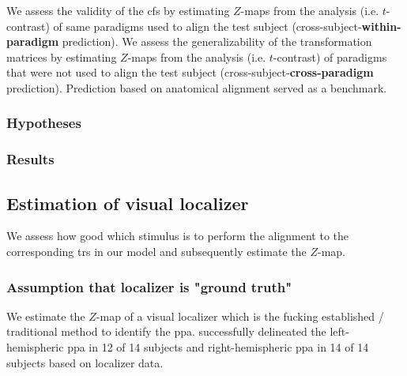 

%
We assess the validity of the \ac{cfs} by estimating $Z$-maps from the analysis
(i.e. $t$-contrast) of same paradigms used to align the test subject
(cross-subject-\textbf{within-paradigm} prediction).
%
We assess the generalizability of the transformation matrices by estimating
$Z$-maps from the analysis (i.e. $t$-contrast) of paradigms that were not used
to align the test subject (cross-subject-\textbf{cross-paradigm} prediction).
%
Prediction based on anatomical alignment served as a benchmark.


\subsubsection{Hypotheses}



\subsubsection{Results}







\subsection{Estimation of visual localizer}

We assess how good which stimulus is to perform the alignment to the
corresponding \acp{tr} in our model and subsequently estimate the $Z$-map.


\subsubsection{Assumption that localizer is "ground truth"}

We estimate the $Z$-map of a visual localizer which is the fucking established /
traditional method to identify the \ac{ppa}.
%
\citet{sengupta2016extension} successfully delineated the left-hemispheric
\ac{ppa} in 12 of 14 subjects and right-hemispheric \ac{ppa} in 14 of 14
subjects based on localizer data.


